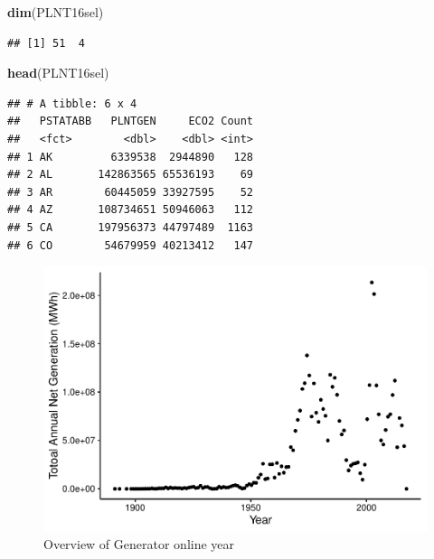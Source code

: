 \documentclass[12pt,]{article}
\newenvironment{Shaded}{\begin{snugshade}}{\end{snugshade}}
\newcommand{\KeywordTok}[1]{\textcolor[rgb]{0.13,0.29,0.53}{\textbf{#1}}}
\newcommand{\CommentTok}[1]{\textcolor[rgb]{0.56,0.35,0.01}{\textit{#1}}}
\newcommand{\NormalTok}[1]{#1}
\begin{document}
\begin{Shaded}
\begin{Highlighting}[]
\KeywordTok{dim}\NormalTok{(PLNT16sel)}
\end{Highlighting}
\end{Shaded}

\begin{verbatim}
## [1] 51  4
\end{verbatim}

\begin{Shaded}
\begin{Highlighting}[]
\KeywordTok{head}\NormalTok{(PLNT16sel)}
\end{Highlighting}
\end{Shaded}

\begin{verbatim}
## # A tibble: 6 x 4
##   PSTATABB   PLNTGEN     ECO2 Count
##   <fct>        <dbl>    <dbl> <int>
## 1 AK         6339538  2944890   128
## 2 AL       142863565 65536193    69
## 3 AR        60445059 33927595    52
## 4 AZ       108734651 50946063   112
## 5 CA       197956373 44797489  1163
## 6 CO        54679959 40213412   147
\end{verbatim}

\begin{Shaded}
\end{Shaded}

\begin{figure}
\centering
\includegraphics{Zhang_X_ENV872_Project_files/figure-latex/unnamed-chunk-2-1.pdf}
\caption{Overview of Generator online year}
\end{figure}
\end{document}

